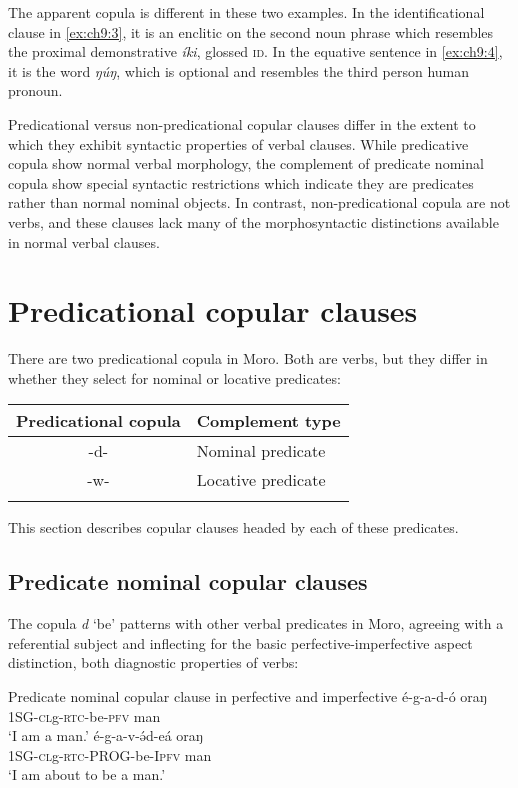 	
The apparent copula is different in these two examples. In the identificational clause in \ref{ex:ch9:3}, it is an enclitic on the second noun phrase which resembles the proximal demonstrative \textit{íki}, glossed \textsc{id}. In the equative sentence in \ref{ex:ch9:4}, it is the word \textit{ŋúŋ}, which is optional and resembles the third person human pronoun.

Predicational versus non-predicational copular clauses differ in the extent to which they exhibit syntactic properties of verbal clauses. While predicative copula show normal verbal morphology, the complement of predicate nominal copula show special syntactic restrictions which indicate they are predicates rather than normal nominal objects. In contrast, non-predicational copula are not verbs, and these clauses lack many of the morphosyntactic distinctions available in normal verbal clauses.


\section{Predicational copular clauses}

There are two predicational copula in Moro. Both are verbs, but they differ in whether they select for nominal or locative predicates: 

\ea  \label{ex:ch9:5}
\begin{tabular}[t]{cl}
\lsptoprule
Predicational copula & Complement type \\
\midrule 
-d- & Nominal predicate\\
-w- & Locative predicate \\ 
\lspbottomrule
\end{tabular}
\z 

This section describes copular clauses headed by each of these predicates.

\subsection{Predicate nominal copular clauses}\label{sec:ch9:nompred}

The copula \textit{d} `be' patterns with other verbal predicates in Moro, agreeing with a referential subject and inflecting for the basic perfective-imperfective aspect distinction, both diagnostic properties of verbs:

\ea Predicate nominal copular clause in perfective and imperfective \label{ex:ch9:6}
	\ea  \gll  é-g-a-d-ó oraŋ\\
		 1SG-\textsc{cl}g-\textsc{rtc}-be-\textsc{pfv} man\\
		 \glt  ‘I am a man.’	
	\ex  \gll é-g-a-v-ə́d-eá oraŋ\\
		 1SG-\textsc{cl}g-\textsc{rtc}-PROG-be-I\textsc{pfv} man\\		
	  	\glt ‘I am about to be a man.’  \z \z 
	  	
